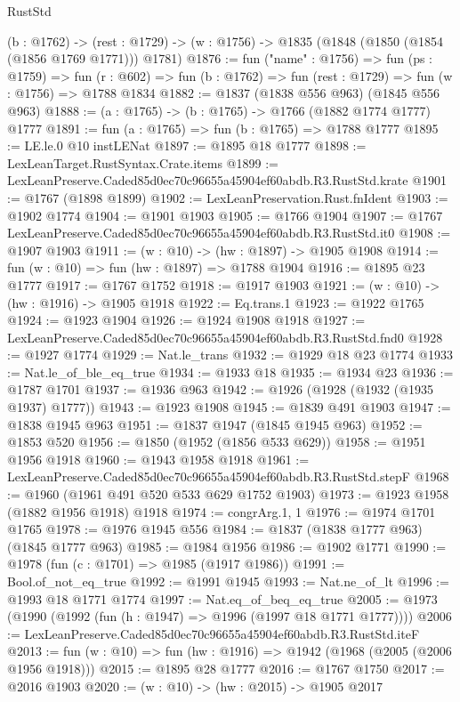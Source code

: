 \begin{lexlean}{RustStd}
\begin{coremodule}
  (b : @1762) ->
  (rest : @1729) -> (w : @1756) -> @1835 (@1848 (@1850 (@1854 (@1856 @1769 @1771))) @1781)
@1876 := fun ("name" : @1756) =>
  fun (ps : @1759) =>
  fun (r : @602) => fun (b : @1762) => fun (rest : @1729) => fun (w : @1756) => @1788 @1834
@1882 := @1837 (@1838 @556 @963) (@1845 @556 @963)
@1888 := (a : @1765) -> (b : @1765) -> @1766 (@1882 @1774 @1777) @1777
@1891 := fun (a : @1765) => fun (b : @1765) => @1788 @1777
@1895 := LE.le.{0} @10 instLENat
@1897 := @1895 @18 @1777
@1898 := LexLeanTarget.RustSyntax.Crate.items
@1899 := LexLeanPreserve.Caded85d0ec70c96655a45904ef60abdb.R3.RustStd.krate
@1901 := @1767 (@1898 @1899)
@1902 := LexLeanPreservation.Rust.fnIdent
@1903 := @1902 @1774
@1904 := @1901 @1903
@1905 := @1766 @1904
@1907 := @1767 LexLeanPreserve.Caded85d0ec70c96655a45904ef60abdb.R3.RustStd.it0
@1908 := @1907 @1903
@1911 := (w : @10) -> (hw : @1897) -> @1905 @1908
@1914 := fun (w : @10) => fun (hw : @1897) => @1788 @1904
@1916 := @1895 @23 @1777
@1917 := @1767 @1752
@1918 := @1917 @1903
@1921 := (w : @10) -> (hw : @1916) -> @1905 @1918
@1922 := Eq.trans.{1}
@1923 := @1922 @1765
@1924 := @1923 @1904
@1926 := @1924 @1908 @1918
@1927 := LexLeanPreserve.Caded85d0ec70c96655a45904ef60abdb.R3.RustStd.fnd0
@1928 := @1927 @1774
@1929 := Nat.le_trans
@1932 := @1929 @18 @23 @1774
@1933 := Nat.le_of_ble_eq_true
@1934 := @1933 @18
@1935 := @1934 @23
@1936 := @1787 @1701
@1937 := @1936 @963
@1942 := @1926 (@1928 (@1932 (@1935 @1937) @1777))
@1943 := @1923 @1908
@1945 := @1839 @491 @1903
@1947 := @1838 @1945 @963
@1951 := @1837 @1947 (@1845 @1945 @963)
@1952 := @1853 @520
@1956 := @1850 (@1952 (@1856 @533 @629))
@1958 := @1951 @1956 @1918
@1960 := @1943 @1958 @1918
@1961 := LexLeanPreserve.Caded85d0ec70c96655a45904ef60abdb.R3.RustStd.stepF
@1968 := @1960 (@1961 @491 @520 @533 @629 @1752 @1903)
@1973 := @1923 @1958 (@1882 @1956 @1918) @1918
@1974 := congrArg.{1, 1}
@1976 := @1974 @1701 @1765
@1978 := @1976 @1945 @556
@1984 := @1837 (@1838 @1777 @963) (@1845 @1777 @963)
@1985 := @1984 @1956
@1986 := @1902 @1771
@1990 := @1978 (fun (c : @1701) => @1985 (@1917 @1986))
@1991 := Bool.of_not_eq_true
@1992 := @1991 @1945
@1993 := Nat.ne_of_lt
@1996 := @1993 @18 @1771 @1774
@1997 := Nat.eq_of_beq_eq_true
@2005 := @1973 (@1990 (@1992 (fun (h : @1947) => @1996 (@1997 @18 @1771 @1777))))
@2006 := LexLeanPreserve.Caded85d0ec70c96655a45904ef60abdb.R3.RustStd.iteF
@2013 := fun (w : @10) => fun (hw : @1916) => @1942 (@1968 (@2005 (@2006 @1956 @1918)))
@2015 := @1895 @28 @1777
@2016 := @1767 @1750
@2017 := @2016 @1903
@2020 := (w : @10) -> (hw : @2015) -> @1905 @2017

\end{coremodule}
\end{lexlean}
